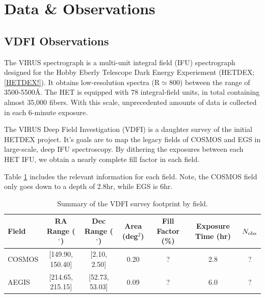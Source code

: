 \documentclass[linenumbers,amsmath,trackchanges,preprint2]{aastex702}
\begin{document}
\section{Data \& Observations}
\subsection{VDFI Observations}
\par The VIRUS spectrograph is a multi-unit integral field (IFU) spectrograph designed for the Hobby Eberly Telescope Dark Energy Experiement (HETDEX; \ref{HETDEX!}). It obtains low-resolution spectra (R$\simeq$800) between the range of 3500-5500\AA. The HET is equipped with 78 integral-field units, in total containing almost 35,000 fibers. With this scale, unprecedented amounts of data is collected in each 6-minute exposure.
\par The VIRUS Deep Field Investigation (VDFI) is a daughter survey of the initial HETDEX project. It's goals are to map the legacy fields of COSMOS and EGS in large-scale, deep IFU spectroscopy. By dithering the exposures between each HET IFU, we obtain a nearly complete fill factor in each field.
\par Table \ref{tab:VDFI Data by Field} includes the relevant information for each field. Note, the COSMOS field only goes down to a depth of 2.8hr, while EGS is 6hr.

\begin{table}
\centering
\caption{Summary of the VDFI survey footprint by field.}
\label{tab:VDFI Data by Field}
\begin{tabular}{lcccccc}
\hline
Field &
RA Range ($^\circ$) &
Dec Range ($^\circ$) &
Area (deg$^2$) &
Fill Factor (\%) &
Exposure Time (hr) &
$N_{\rm obs}$ \\
\hline
COSMOS & [149.90, 150.40] & [2.10, 2.50] & 0.20 & ? & 2.8 & ? \\
AEGIS  & [214.65, 215.15] & [52.73, 53.03] & 0.09 & ? & 6.0 & ? \\
\hline
\end{tabular}
\end{table}
\end{document}
